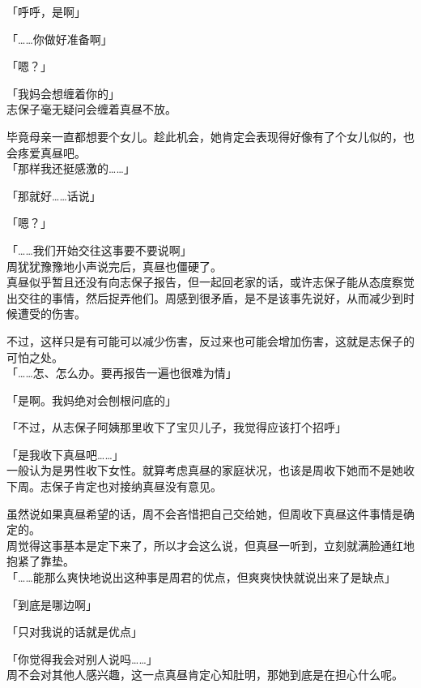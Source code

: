 「呼呼，是啊」

「……你做好准备啊」

「嗯？」

「我妈会想缠着你的」\\

志保子毫无疑问会缠着真昼不放。

毕竟母亲一直都想要个女儿。趁此机会，她肯定会表现得好像有了个女儿似的，也会疼爱真昼吧。\\

「那样我还挺感激的……」

「那就好……话说」

「嗯？」

「……我们开始交往这事要不要说啊」\\

周犹犹豫豫地小声说完后，真昼也僵硬了。\\

真昼似乎暂且还没有向志保子报告，但一起回老家的话，或许志保子能从态度察觉出交往的事情，然后捉弄他们。周感到很矛盾，是不是该事先说好，从而减少到时候遭受的伤害。

不过，这样只是有可能可以减少伤害，反过来也可能会增加伤害，这就是志保子的可怕之处。\\

「……怎、怎么办。要再报告一遍也很难为情」

「是啊。我妈绝对会刨根问底的」

「不过，从志保子阿姨那里收下了宝贝儿子，我觉得应该打个招呼」

「是我收下真昼吧……」\\

一般认为是男性收下女性。就算考虑真昼的家庭状况，也该是周收下她而不是她收下周。志保子肯定也对接纳真昼没有意见。

虽然说如果真昼希望的话，周不会吝惜把自己交给她，但周收下真昼这件事情是确定的。\\

周觉得这事基本是定下来了，所以才会这么说，但真昼一听到，立刻就满脸通红地抱紧了靠垫。\\

「……能那么爽快地说出这种事是周君的优点，但爽爽快快就说出来了是缺点」

「到底是哪边啊」

「只对我说的话就是优点」

「你觉得我会对别人说吗……」\\

周不会对其他人感兴趣，这一点真昼肯定心知肚明，那她到底是在担心什么呢。\\

